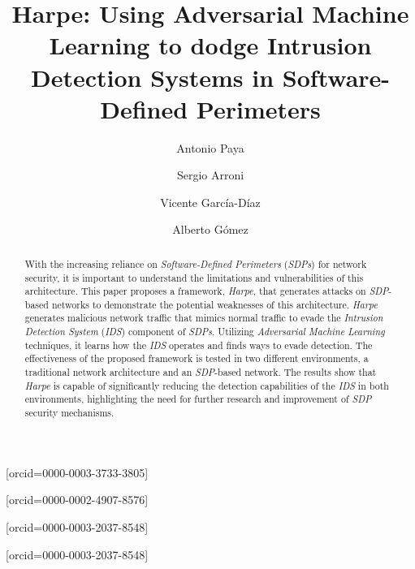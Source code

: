 \documentclass[a4paper,fleqn]{cas-dc}
\begin{document}

    \title [mode = title]{Harpe: Using Adversarial Machine Learning to dodge Intrusion Detection Systems in
    Software-Defined Perimeters}


    \author[uniovi]{Antonio Paya}[orcid=0000-0003-3733-3805]\cormark[1]

    \author[uniovi]{Sergio Arroni}[orcid=0000-0002-4907-8576]

    \author[uniovi]{Vicente García-Díaz}[orcid=0000-0003-2037-8548]

    \author[epi]{Alberto Gómez}[orcid=0000-0003-2037-8548]

    \address[uniovi]{Department of Computer Science,
        University of Oviedo, Science Faculty, Oviedo, Spain}
    \address[epi]{Department of Business Administration, University of Oviedo, Gijón, Spain}

    \begin{abstract}
        With the increasing reliance on \textit{Software-Defined Perimeters} (\textit{SDPs}) for network security, it
        is important to understand the limitations and vulnerabilities of this architecture.
        This paper proposes a framework, \textit{Harpe}, that generates attacks on \textit{SDP}-based networks to
        demonstrate the potential weaknesses of this architecture.
        \textit{Harpe} generates malicious network traffic that mimics normal traffic to evade the
        \textit{Intrusion Detection System} (\textit{IDS}) component of \textit{SDPs}.
        Utilizing \textit{Adversarial Machine Learning} techniques, it learns how the \textit{IDS} operates and finds
        ways to evade detection.
        The effectiveness of the proposed framework is tested in two different environments, a traditional network
        architecture and an \textit{SDP}-based network.
        The results show that \textit{Harpe} is capable of significantly reducing the detection capabilities of the
        \textit{IDS} in both environments, highlighting the need for further research and improvement of \textit{SDP}
        security mechanisms.
    \end{abstract}
\end{document}
